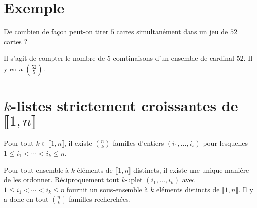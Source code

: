 \documentclass[../main.tex]{subfiles}
\begin{document}
\section{Exemple}
\begin{tcolorbox}[title=Exemple 31.40, title filled=false, colframe=darkgreen, colback=darkgreen!10!white]
    De combien de façon peut-on tirer $5$ cartes simultanément dans un jeu de $52$ cartes ?
\end{tcolorbox}

\noindent Il s'agit de compter le nombre de $5$-combinaisons d'un ensemble de cardinal $52$. Il y en a $\binom{52}{5}$.

\section{$k$-listes strictement croissantes de $\llbracket 1, n \rrbracket$}
\begin{tcolorbox}[title=Théorème 31.41, title filled=false, colframe=orange, colback=orange!10!white]
    Pour tout $k\in \llbracket 1, n \rrbracket$, il existe $\binom{n}{k}$ familles d'entiers $(i_1, \ldots, i_k)$ pour lesquelles $1\leq i_1 < \cdots < i_k \leq n$.
\end{tcolorbox}

\noindent Pour tout ensemble à $k$ éléments de $\llbracket 1, n \rrbracket$ distincts, il existe une unique manière de les ordonner. Réciproquement tout $k$-uplet $(i_1, \ldots, i_k)$ avec $1\leq i_1 < \cdots < i_k \leq n$ fournit un sous-ensemble à $k$ eléments distincts de $\llbracket 1, n \rrbracket$. Il y a donc en tout $\binom{n}{k}$ familles recherchées. 
\end{document}
